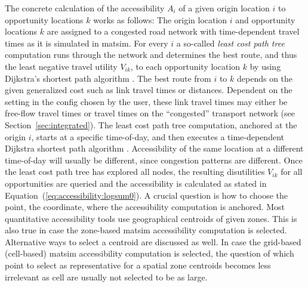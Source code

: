 The concrete calculation of the accessibility $A_i$ of a given origin location $i$ to opportunity locations $k$ 
works as follows: The origin location $i$ and opportunity locations $k$ are assigned to a congested road network 
with time-dependent travel times as it is simulated in \gls{matsim}. For every $i$ a so-called 
\emph{least cost path tree} computation runs through the network and determines the best route, and thus the 
least negative travel utility $V_{ik}$, to each opportunity location $k$ by using Dijkstra's shortest path 
algorithm \citep{Dijkstra1959ShortestPath}. The best route from $i$ to $k$ depends on the given generalized cost 
such as link travel times or distances. Dependent on the setting in the config chosen by the user, 
these link travel times may either be free-flow travel 
times or travel times on the ``congested'' transport network (see Section~\ref{sec:integrated}). The least cost 
path tree computation, anchored at the origin $i$, starts at a specific time-of-day, and then executes a 
time-dependent Dijkstra shortest path algorithm \citep{LefebvreBalmer2007Fastshortestpath}. Accessibility of the 
same location at a different time-of-day will usually be different, since congestion patterns are different.
Once the least cost path tree has explored all nodes, the resulting disutilities $V_{ik}$ for all opportunities 
are queried and the accessibility is calculated as stated in Equation~(\ref{eq:accessibility:logsum0}).
%
A crucial question is how to choose the point, \ie the coordinate, where the accessibility computation is anchored. 
Most quantitative accessibility tools use geographical centroids of given zones. This is also true in case the 
zone-based \gls{matsim} accessibility computation is selected. Alternative ways to select a centroid \citep[\eg land-use-based centroids][]{BuettnerEtAl2010Erreichbarkeitsatlas} are discussed as well. In case the 
grid-based (cell-based) \gls{matsim} accessibility computation is selected, the question of which point to
select as representative for a spatial zone centroids becomes less irrelevant as cell are usually not
selected to be as large.


